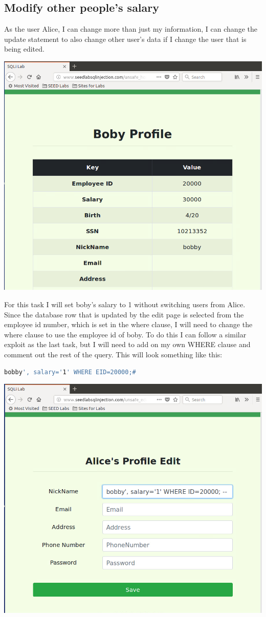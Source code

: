 \documentclass[14pt]{extarticle}
\begin{document}
\subsection{Modify other people's salary}
As the user Alice, I can change more than just my information, I can change the update statement to also change other user's data if I change the user that is being edited\cite{seed-sqlatk}. \\
\begin{center}
	\includegraphics[width=0.6\linewidth]{boby-start}\\
\end{center}
For this task I will set boby's salary to 1 without switching users from Alice. Since the database row that is updated by the edit page is selected from the employee id number, which is set in the where clause, I will need to change the where clause to use the employee id of boby. To do this I can follow a similar exploit as the last task, but I will need to add on my own WHERE clause and comment out the rest of the query. This will look something like this:
\begin{lstlisting}[language=sh]
bobby', salary='1' WHERE EID=20000;#
\end{lstlisting}
\begin{center}
	\includegraphics[width=0.6\linewidth]{alice-editing-boby}\\
\end{center}
\end{document}
